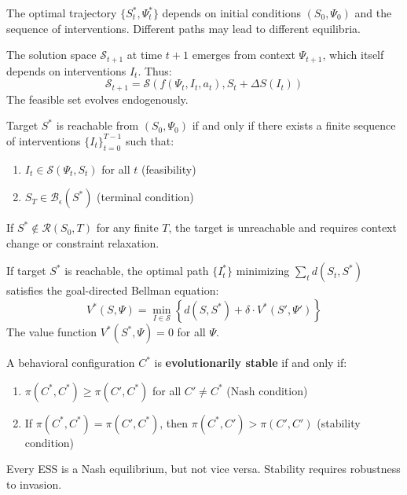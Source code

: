 \begin{theorem}
The optimal trajectory $\{S^*_t, \Psi^*_t\}$ depends on initial conditions $(S_0, \Psi_0)$
and the sequence of interventions. Different paths may lead to different equilibria.
\end{theorem}

\begin{theorem}
The solution space $\mathcal{S}_{t+1}$ at time $t+1$ emerges from context $\Psi_{t+1}$,
which itself depends on interventions $I_t$. Thus:
\[
\mathcal{S}_{t+1} = \mathcal{S}(f(\Psi_t, I_t, a_t), S_t + \Delta S(I_t))
\]
The feasible set evolves endogenously.
\end{theorem}

\begin{theorem}
Target $S^*$ is reachable from $(S_0, \Psi_0)$ if and only if there exists a finite
sequence of interventions $\{I_t\}_{t=0}^{T-1}$ such that:
\begin{enumerate}
\item $I_t \in \mathcal{S}(\Psi_t, S_t)$ for all $t$ (feasibility)
\item $S_T \in \mathcal{B}_\epsilon(S^*)$ (terminal condition)
\end{enumerate}
If $S^* \notin \mathcal{R}(S_0, T)$ for any finite $T$, the target is unreachable
and requires context change or constraint relaxation.
\end{theorem}

\begin{theorem}
If target $S^*$ is reachable, the optimal path $\{I^*_t\}$ minimizing $\sum_t d(S_t, S^*)$
satisfies the goal-directed Bellman equation:
\[
V^*(S, \Psi) = \min_{I \in \mathcal{S}} \left\{ d(S, S^*) + \delta \cdot V^*(S', \Psi') \right\}
\]
The value function $V^*(S^*, \Psi) = 0$ for all $\Psi$.
\end{theorem}

\begin{theorem}
A behavioral configuration $C^*$ is \textbf{evolutionarily stable} if and only if:
\begin{enumerate}
\item $\pi(C^*, C^*) \geq \pi(C', C^*)$ for all $C' \neq C^*$ (Nash condition)
\item If $\pi(C^*, C^*) = \pi(C', C^*)$, then $\pi(C^*, C') > \pi(C', C')$ (stability condition)
\end{enumerate}
Every ESS is a Nash equilibrium, but not vice versa. Stability requires robustness to invasion.
\end{theorem}

